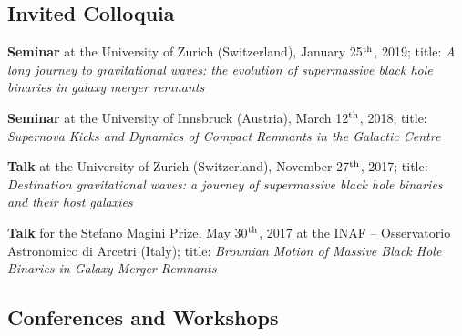 \documentclass[11pt,a4paper]{article}
\begin{document}
\subsection*{Invited Colloquia}

\begin{etaremune}

    \item {\bf Seminar} at the University of Zurich (Switzerland), January 25$^{\rm th}$, 2019; title: {\it A long journey to gravitational waves: the evolution of supermassive black hole binaries in galaxy merger remnants}

    \item {\bf Seminar} at the University of Innsbruck (Austria), March 12$^{\rm th}$, 2018; title: {\it Supernova Kicks and Dynamics of Compact Remnants in the Galactic Centre}

    \item {\bf Talk} at the University of Zurich (Switzerland), November 27$^{\rm th}$, 2017; title: {\it Destination gravitational waves: a journey of supermassive black hole binaries and their host galaxies}

    \item {\bf Talk} for the Stefano Magini Prize, May 30$^{\rm th}$, 2017 at the INAF – Osservatorio Astronomico di Arcetri (Italy); title: {\it Brownian Motion of Massive Black Hole Binaries in Galaxy Merger Remnants}

\end{etaremune}


\subsection*{Conferences and Workshops}
\end{document}
